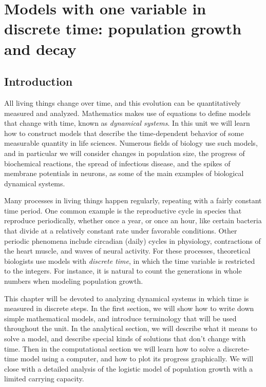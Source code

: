 \documentclass[11pt]{book}
\begin{document}
\chapter[One variable in discrete time]{Models with one variable in discrete time: population growth and decay}

\doublespacing


\section{Introduction}
All living things change over time, and this evolution can be quantitatively measured and analyzed. Mathematics makes use of equations to define models that change with time, known as \emph{dynamical systems}. In this unit we will learn how to construct models that describe the time-dependent behavior of some measurable quantity in life sciences. Numerous fields of biology use such models, and in particular we will consider changes in population size, the progress of biochemical reactions, the spread of infectious disease, and the spikes of membrane potentials in neurons, as some of the main examples of biological dynamical systems.

Many processes in living things happen regularly, repeating with a fairly constant time period. One common example is the reproductive cycle in species that reproduce periodically, whether once a year, or once an hour, like certain bacteria that divide at a relatively constant rate under favorable conditions. Other periodic phenomena include circadian (daily) cycles in physiology, contractions of the heart muscle, and waves of neural activity. For these processes, theoretical biologists use models with \emph{discrete time}, in which the time variable is restricted to the integers. For instance, it is natural to count the generations in whole numbers when modeling population growth.

This chapter will be devoted to analyzing dynamical systems in which time is measured in discrete steps. In the first section, we will show how to write down simple mathematical models, and introduce terminology that will be used throughout the unit. In the analytical section, we will describe what it means to solve a model, and describe special kinds of solutions that don't change with time. Then in the computational section we will learn how to solve a discrete-time model using a computer, and how to plot its progress graphically. We will close with a detailed analysis of the logistic model of population growth with a limited carrying capacity.
\end{document}
